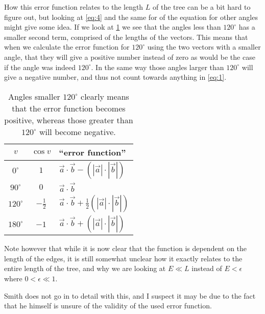 How this error function relates to the length $L$ of the tree can be a bit hard
to figure out, but looking at \cref{eq:4} and the same for of the equation for
other angles might give some idea.  If we look at \cref{tab:error-functions} we
see that the angles less than $120^{\circ}$ has a smaller second term, comprised
of the lengths of the vectors.  This means that when we calculate the error
function for $120^{\circ}$ using the two vectors with a smaller angle, that they
will give a positive number instead of zero as would be the case if the angle
was indeed $120^{\circ}$.  In the same way those angles larger than
$120^{\circ}$ will give a negative number, and thus not count towards anything
in \cref{eq:1}.

\begin{table}[htbp] \centering
  \begin{tabular}{ccl}
    \toprule
    $v$           & $\cos v$       & ``error function''                    \\
    \midrule
    $0^{\circ}$   & $1$            & $\vec a \cdot \vec b -
                                     (|\vec a| \cdot |\vec b|)$            \\
    $90^{\circ}$  & $0$            & $\vec a \cdot \vec b$                 \\
    $120^{\circ}$ & $-\frac{1}{2}$ & $\vec a \cdot \vec b +
                                     \frac{1}{2}(|\vec a| \cdot |\vec b|)$ \\
    $180^{\circ}$ & $-1$           & $\vec a \cdot \vec b +
                                     (|\vec a| \cdot |\vec b|)$            \\
    \bottomrule
  \end{tabular}
  \caption[Angles and their corresponding ``error functions'']{Angles smaller
    $\mathit{120^{\circ}}$ clearly means that the error function becomes positive,
    whereas those greater than $\mathit{120^{\circ}}$ will become
    negative.\label{tab:error-functions}}
\end{table}

Note however that while it is now clear that the function is dependent on the
length of the edges, it is still somewhat unclear how it exactly relates to the
entire length of the tree, and why we are looking at $E \ll L$ instead of $E <
\epsilon$ where $0 < \epsilon \ll 1$.

Smith does not go in to detail with this, and I suspect it may be due to the
fact that he himself is unsure of the validity of the used error function.

